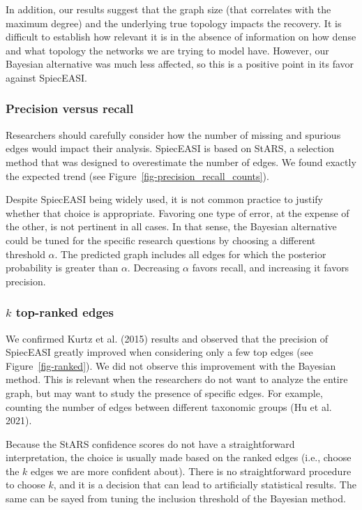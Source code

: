 \documentclass[
  a4paper,
]{article}
\begin{document}
In addition, our results suggest that the graph size (that correlates
with the maximum degree) and the underlying true topology impacts the
recovery. It is difficult to establish how relevant it is in the absence
of information on how dense and what topology the networks we are trying
to model have. However, our Bayesian alternative was much less affected,
so this is a positive point in its favor against SpiecEASI.

\hypertarget{precision-versus-recall-1}{%
\subsubsection{Precision versus
recall}\label{precision-versus-recall-1}}

Researchers should carefully consider how the number of missing and
spurious edges would impact their analysis. SpiecEASI is based on StARS,
a selection method that was designed to overestimate the number of
edges. We found exactly the expected trend (see
Figure~\ref{fig-precision_recall_counts}).

Despite SpiecEASI being widely used, it is not common practice to
justify whether that choice is appropriate. Favoring one type of error,
at the expense of the other, is not pertinent in all cases. In that
sense, the Bayesian alternative could be tuned for the specific research
questions by choosing a different threshold \(\alpha\). The predicted
graph includes all edges for which the posterior probability is greater
than \(\alpha\). Decreasing \(\alpha\) favors recall, and increasing it
favors precision.

\hypertarget{k-top-ranked-edges-1}{%
\subsubsection{\texorpdfstring{\(k\) top-ranked
edges}{k top-ranked edges}}\label{k-top-ranked-edges-1}}

We confirmed Kurtz et al. (2015) results and observed that the precision
of SpiecEASI greatly improved when considering only a few top edges (see
Figure~\ref{fig-ranked}). We did not observe this improvement with the
Bayesian method. This is relevant when the researchers do not want to
analyze the entire graph, but may want to study the presence of specific
edges. For example, counting the number of edges between different
taxonomic groups (Hu et al. 2021).

Because the StARS confidence scores do not have a straightforward
interpretation, the choice is usually made based on the ranked edges
(i.e., choose the \(k\) edges we are more confident about). There is no
straightforward procedure to choose \(k\), and it is a decision that can
lead to artificially statistical results. The same can be sayed from
tuning the inclusion threshold of the Bayesian method.
\end{document}
